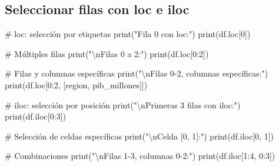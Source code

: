 \documentclass[
  doc,
  floatsintext,
  longtable,
  a4paper,
  nolmodern,
  notxfonts,
  notimes,
  12pt,
  colorlinks=true,linkcolor=blue,citecolor=blue,urlcolor=blue]{apa7}
\newenvironment{Shaded}{\begin{snugshade}}{\end{snugshade}}
\newcommand{\BuiltInTok}[1]{\textcolor[rgb]{0.00,0.23,0.31}{#1}}
\newcommand{\CharTok}[1]{\textcolor[rgb]{0.13,0.47,0.30}{#1}}
\newcommand{\CommentTok}[1]{\textcolor[rgb]{0.37,0.37,0.37}{#1}}
\newcommand{\DecValTok}[1]{\textcolor[rgb]{0.68,0.00,0.00}{#1}}
\newcommand{\NormalTok}[1]{\textcolor[rgb]{0.00,0.23,0.31}{#1}}
\newcommand{\StringTok}[1]{\textcolor[rgb]{0.13,0.47,0.30}{#1}}
\begin{document}
\subsection{Seleccionar filas con loc e
iloc}\label{seleccionar-filas-con-loc-e-iloc}

\begin{Shaded}
\begin{Highlighting}[]
\CommentTok{\# loc: selección por etiquetas}
\BuiltInTok{print}\NormalTok{(}\StringTok{"Fila 0 con loc:"}\NormalTok{)}
\BuiltInTok{print}\NormalTok{(df.loc[}\DecValTok{0}\NormalTok{])}

\CommentTok{\# Múltiples filas}
\BuiltInTok{print}\NormalTok{(}\StringTok{"}\CharTok{\textbackslash{}n}\StringTok{Filas 0 a 2:"}\NormalTok{)}
\BuiltInTok{print}\NormalTok{(df.loc[}\DecValTok{0}\NormalTok{:}\DecValTok{2}\NormalTok{])}

\CommentTok{\# Filas y columnas específicas}
\BuiltInTok{print}\NormalTok{(}\StringTok{"}\CharTok{\textbackslash{}n}\StringTok{Filas 0{-}2, columnas específicas:"}\NormalTok{)}
\BuiltInTok{print}\NormalTok{(df.loc[}\DecValTok{0}\NormalTok{:}\DecValTok{2}\NormalTok{, [}\StringTok{\textquotesingle{}region\textquotesingle{}}\NormalTok{, }\StringTok{\textquotesingle{}pib\_millones\textquotesingle{}}\NormalTok{]])}

\CommentTok{\# iloc: selección por posición}
\BuiltInTok{print}\NormalTok{(}\StringTok{"}\CharTok{\textbackslash{}n}\StringTok{Primeras 3 filas con iloc:"}\NormalTok{)}
\BuiltInTok{print}\NormalTok{(df.iloc[}\DecValTok{0}\NormalTok{:}\DecValTok{3}\NormalTok{])}

\CommentTok{\# Selección de celdas específicas}
\BuiltInTok{print}\NormalTok{(}\StringTok{"}\CharTok{\textbackslash{}n}\StringTok{Celda [0, 1]:"}\NormalTok{)}
\BuiltInTok{print}\NormalTok{(df.iloc[}\DecValTok{0}\NormalTok{, }\DecValTok{1}\NormalTok{])}

\CommentTok{\# Combinaciones}
\BuiltInTok{print}\NormalTok{(}\StringTok{"}\CharTok{\textbackslash{}n}\StringTok{Filas 1{-}3, columnas 0{-}2:"}\NormalTok{)}
\BuiltInTok{print}\NormalTok{(df.iloc[}\DecValTok{1}\NormalTok{:}\DecValTok{4}\NormalTok{, }\DecValTok{0}\NormalTok{:}\DecValTok{3}\NormalTok{])}
\end{Highlighting}
\end{Shaded}
\end{document}
